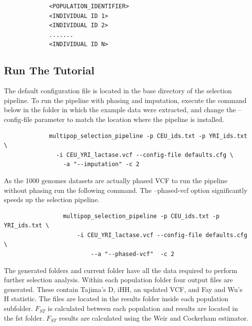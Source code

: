 \documentclass[a4paper,10pt]{article}
\begin{document}
             \begin{verbatim}
             <POPULATION_IDENTIFIER>
             <INDIVIDUAL ID 1>
             <INDIVIDUAL ID 2>
             .......
             <INDIVIDUAL ID N>
             \end{verbatim}
             \subsection{Run The Tutorial}
             The default configuration file is located in the base directory of the
             selection pipeline. To run the pipeline with phasing and imputation, execute the command below in the folder in which the example data were extracted, and change the
             --config-file parameter to match the location where the pipeline is installed.\\
             \begin{verbatim}
             multipop_selection_pipeline -p CEU_ids.txt -p YRI_ids.txt \
               -i CEU_YRI_lactase.vcf --config-file defaults.cfg \
                 -a "--imputation" -c 2
                 \end{verbatim}

                 \noindent
                 As the 1000 genomes datasets are actually phased VCF to run the pipeline without phasing run the following command. The --phased-vcf option significantly speeds up the selection pipeline.

                 \begin{verbatim}
                 multipop_selection_pipeline -p CEU_ids.txt -p YRI_ids.txt \
                     -i CEU_YRI_lactase.vcf --config-file defaults.cfg \
                         --a "--phased-vcf"  -c 2  
                         \end{verbatim} 

                         \noindent
                         The generated folders and current folder have all the data required to
                         perform further selection analysis. Within each population folder four
                         output files are generated.  These contain Tajima's D, iHH, an updated
                         VCF, and Fay and Wu's H statistic. The files are located in the
                         results folder inside each population subfolder. $F_{ST}$ is calculated
                         between each population and results are located in the fst folder. $F_{ST}$
                         results are calculated using the Weir and Cockerham estimator.
\end{document}
